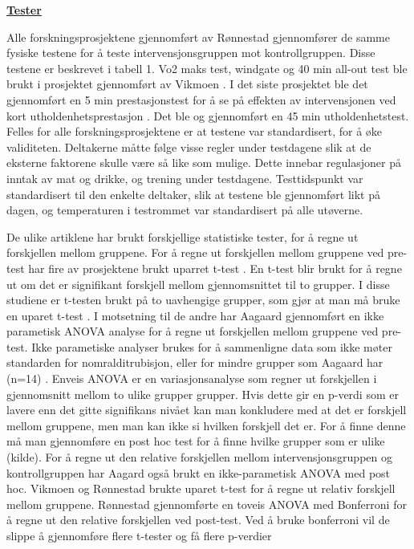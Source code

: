\documentclass[
]{book}
\begin{document}
\underline{\textbf{Tester}}

Alle forskningsprosjektene gjennomført av Rønnestad \citep{rønnestad2010a, rønnestad2010b, rønnestad2015} gjennomfører de samme fysiske testene for å teste intervensjonsgruppen mot kontrollgruppen. Disse testene er beskrevet i tabell 1. Vo2 maks test, windgate og 40 min all-out test ble brukt i prosjektet gjennomført av Vikmoen \citep{vikmoen2016}. I det siste prosjektet ble det gjennomført en 5 min prestasjonstest for å se på effekten av intervensjonen ved kort utholdenhetsprestasjon \citep{aagaard2011}. Det ble og gjennomført en 45 min utholdenhetstest. Felles for alle forskningsprosjektene er at testene var standardisert, for å øke validiteten. Deltakerne måtte følge visse regler under testdagene slik at de eksterne faktorene skulle være så like som mulige. Dette innebar regulasjoner på inntak av mat og drikke, og trening under testdagene. Testtidspunkt var standardisert til den enkelte deltaker, slik at testene ble gjennomført likt på dagen, og temperaturen i testrommet var standardisert på alle utøverne.

De ulike artiklene har brukt forskjellige statistiske tester, for å regne ut forskjellen mellom gruppene. For å regne ut forskjellen mellom gruppene ved pre-test har fire av prosjektene brukt uparret t-test \citep{rønnestad2010a, rønnestad2010b, rønnestad2015, vikmoen2016}. En t-test blir brukt for å regne ut om det er signifikant forskjell mellom gjennomsnittet til to grupper. I disse studiene er t-testen brukt på to uavhengige grupper, som gjør at man må bruke en uparet t-test \citet{kim2015} . I motsetning til de andre har Aagaard \citep{aagaard2011} gjennomført en ikke parametisk ANOVA analyse for å regne ut forskjellen mellom gruppene ved pre-test. Ikke parametiske analyser brukes for å sammenligne data som ikke møter standarden for nomralditrubisjon, eller for mindre grupper som Aagaard har (n=14) \citep{altman2009}. Enveis ANOVA er en variasjonsanalyse som regner ut forskjellen i gjennomsnitt mellom to ulike grupper grupper. Hvis dette gir en p-verdi som er lavere enn det gitte signifikans nivået kan man konkludere med at det er forskjell mellom gruppene, men man kan ikke si hvilken forskjell det er. For å finne denne må man gjennomføre en post hoc test for å finne hvilke grupper som er ulike (kilde). For å regne ut den relative forskjellen mellom intervensjonsgruppen og kontrollgruppen har Aagard også brukt en ikke-parametisk ANOVA med post hoc. Vikmoen \citep{vikmoen2016} og Rønnestad \citep{rønnestad2015} brukte uparet t-test for å regne ut relativ forskjell mellom gruppene. Rønnestad \citep{rønnestad2010a, rønnestad2010b} gjennomførte en toveis ANOVA med Bonferroni for å regne ut den relative forskjellen ved post-test. Ved å bruke bonferroni vil de slippe å gjennomføre flere t-tester og få flere p-verdier
\end{document}
